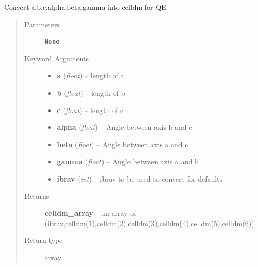 \documentclass[letterpaper,10pt,english]{sphinxmanual}
\begin{document}
\begin{fulllineitems}
\label{retr:retr.abc2celldm}
Convert a,b,c,alpha,beta,gamma into celldm for QE
\begin{quote}\begin{description}
\item[{Parameters}] \leavevmode
\textbf{\texttt{None}} -- 

\item[{Keyword Arguments}] \leavevmode\begin{itemize}
\item {} 
\textbf{a} (\emph{float}) --
length of a

\item {} 
\textbf{b} (\emph{float}) --
length of b

\item {} 
\textbf{c} (\emph{float}) --
length of c

\item {} 
\textbf{alpha} (\emph{float}) --
Angle between axis b and c

\item {} 
\textbf{beta} (\emph{float}) --
Angle between axis a and c

\item {} 
\textbf{gamma} (\emph{float}) --
Angle between axis a and b

\item {} 
\textbf{ibrav} (\emph{int}) --
ibrav to be used to convert for defaults

\end{itemize}

\item[{Returns}] \leavevmode
\textbf{celldm\_array} --
an array of (ibrav,celldm(1),celldm(2),celldm(3),celldm(4),celldm(5),celldm(6))

\item[{Return type}] \leavevmode
array

\end{description}\end{quote}

\end{fulllineitems}

\end{document}
